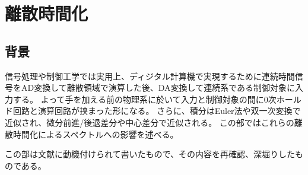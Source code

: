 \part{離散時間化}
    \chapter{背景}
        信号処理や制御工学では実用上、ディジタル計算機で実現するために連続時間信号をAD変換して離散領域で演算した後、DA変換して連続系である制御対象に入力する。
        よって手を加える前の物理系に於いて入力と制御対象の間に0次ホールド回路と演算回路が挟まった形になる。
        さらに、積分はEuler法や双一次変換で近似され、微分前進/後退差分や中心差分で近似される。
        この部ではこれらの離散時間化によるスペクトルへの影響を述べる。
        \par
        この部は文献\cite{digital-servo}に動機付けられて書いたもので、その内容を再確認、深堀りしたものである。
    
    
